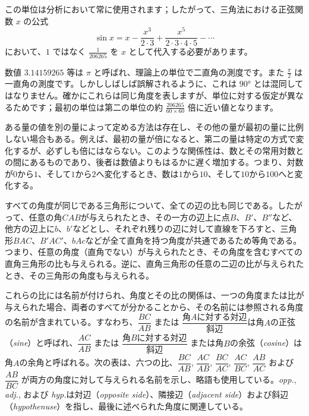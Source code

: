 \documentclass[a4paper,11pt,openany]{ltjsbook}
\begin{document}
この単位は分析において常に使用されます；したがって、三角法における正弦関数 $x$ の公式
\[
\sin x = x - \frac{x^{3}}{2·3} + \frac{x^{5}}{2·3·4·5} - \cdots
\]
において、$1$ ではなく $\frac{1}{206265}$ を $x$ として代入する必要があります。

数値 $3.14159265$ 等は $\pi$ と呼ばれ、理論上の単位で二直角の測度です。また $\frac{\pi}{2}$ は一直角の測度です。しかししばしば誤解されるように、これは $90°$ とは混同してはなりません。確かにこれらは同じ角度を表しますが、単位に対する仮定が異なるためです；最初の単位は第二の単位の約 $\frac{206265}{60 × 60}$ 倍に近い値となります。

ある量の値を別の量によって定める方法は存在し、その他の量が最初の量に比例しない場合もある。例えば、最初の量が倍になると、第二の量は特定の方式で変化するが、必ずしも倍にはならない。このような関係性は、数とその常用対数との間にあるものであり、後者は数値よりもはるかに遅く増加する。つまり、対数が$0$から$1$、そして$1$から$2$へ変化するとき、数は$1$から$10$、そして$10$から$100$へと変化する。

すべての角度が同じである三角形について、全ての辺の比も同じである。したがって、任意の角$CAB$が与えられたとき、その一方の辺上に点$B$、$B'$、$B''$など、他方の辺上に$b$、$b'$などとし、それぞれ残りの辺に対して直線を下ろすと、三角形$BAC$、$B'AC'$、$bAc$などが全て直角を持つ角度が共通であるため等角である。つまり、任意の角度（直角でない）が与えられたとき、その角度を含むすべての直角三角形の比も与えられる。逆に、直角三角形の任意の二辺の比が与えられたとき、その三角形の角度も与えられる。

これらの比には名前が付けられ、角度とその比の関係は、一つの角度または比が与えられた場合、両者のすべてが分かることから、その名前には参照される角度の名前が含まれている。すなわち、$\dfrac{BC}{AB}$ または $\dfrac{\text{角$A$に対する対辺}}{\text{斜辺}}$は角$A$の正弦（\emph{sine}）と呼ばれ、$\dfrac{AC}{AB}$ または $\dfrac{\text{角$B$に対する対辺}}{\text{斜辺}}$ または角$B$の余弦（\emph{cosine}）は角$A$の余角と呼ばれる。次の表は、六つの比、$\dfrac{BC}{AB}$, $\dfrac{AC}{AB}$, $\dfrac{BC}{AC}$, $\dfrac{AC}{BC}$, $\dfrac{AB}{AC}$ および $\dfrac{AB}{BC}$ が両方の角度に対して与えられる名前を示し、略語も使用している。\emph{opp.}, \emph{adj.}, および \emph{hyp.}は対辺（\emph{opposite side}）、隣接辺（\emph{adjacent side}）および斜辺（\emph{hypothenuse}）を指し、最後に述べられた角度に関連している。
\end{document}
